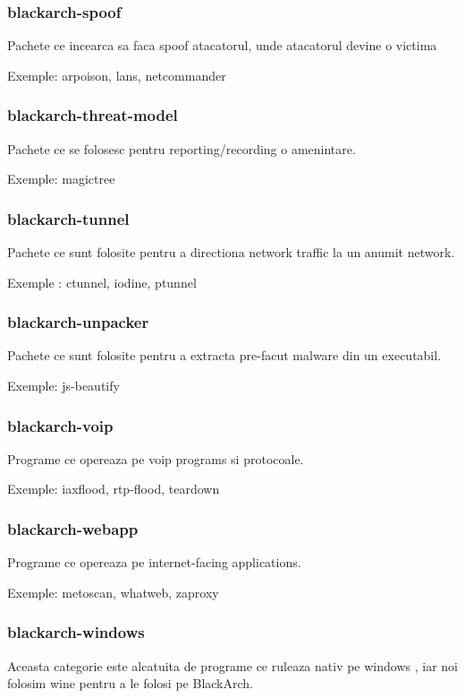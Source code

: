 \documentclass[a4paper, oneside, 11pt]{book}
\begin{document}
\subsubsection{blackarch-spoof}
Pachete ce incearca sa faca spoof atacatorul, unde atacatorul devine o victima

Exemple: arpoison, lans, netcommander

\subsubsection{blackarch-threat-model}
Pachete  ce se folosesc pentru reporting/recording o amenintare.

Exemple: magictree

\subsubsection{blackarch-tunnel}
Pachete ce sunt folosite pentru a directiona network traffic la un anumit network.

Exemple : ctunnel, iodine, ptunnel

\subsubsection{blackarch-unpacker}
Pachete ce sunt  folosite pentru a extracta pre-facut malware din un
executabil.

Exemple: js-beautify

\subsubsection{blackarch-voip}
Programe ce opereaza pe voip programs si protocoale.

Exemple: iaxflood, rtp-flood, teardown

\subsubsection{blackarch-webapp}
Programe ce opereaza pe internet-facing applications.

Exemple: metoscan, whatweb, zaproxy

\subsubsection{blackarch-windows}
Aceasta categorie este alcatuita de programe ce ruleaza nativ pe windows ,  iar noi folosim wine pentru a le folosi pe BlackArch.
\end{document}
